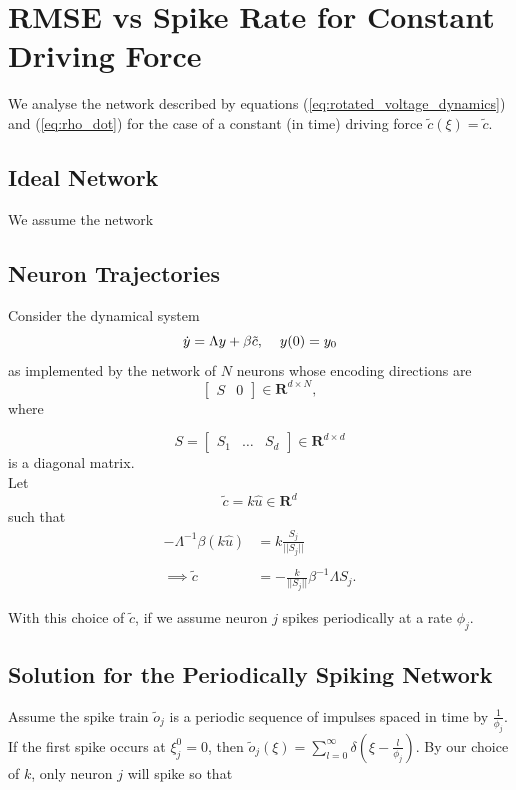 \section{RMSE vs Spike Rate for Constant Driving Force}
\label{section:analysis:sc_rmse}



We analyse the network described by equations (\ref{eq:rotated_voltage_dynamics}) and (\ref{eq:rho_dot}) for the case of a constant (in time) driving force $\tilde{c}(\xi) = \tilde{c}$. \\

\subsection{Ideal Network}
We assume the network 



\subsection{Neuron Trajectories}
Consider the dynamical system 
$$
\dot{y} = \Lambda y + \beta \tilde{c}, \hspace{4mm} y(0) = y_0
$$
as implemented by the network of $N$ neurons whose encoding directions are
$$
\begin{bmatrix}
S & 0
\end{bmatrix} \in \mathbf{R}^{d \times N},
$$
where

$$S = \begin{bmatrix}
S_1 & \hdots & S_d
\end{bmatrix} \in \mathbf{R}^{d \times d}$$
is a diagonal matrix.\\


Let $$\tilde{c} =  k \hat{u} \in \mathbf{R}^d$$ such that
\begin{align*}
-\Lambda^{-1} \beta (k \hat{u}) &= k \frac{S_j}{||S_j||}
\\
\\
\implies
\tilde{c} &= -\frac{k}{||S_j||} \beta^{-1} \Lambda S_j.
\end{align*}

With this choice of $\tilde{c}$,  if we assume neuron $j$ spikes periodically at a rate $\phi_j$. 

\subsection{Solution for the Periodically Spiking Network}

 Assume the spike train $\tilde{o}_j$ is a periodic sequence of impulses spaced in time by $\frac{1}{\phi_j}$. If the first spike occurs at $\xi_j^0 = 0$, then $\tilde{o}_j(\xi) = \sum_{l=0}^{\infty} \delta \left(\xi-\frac{l}{\phi_j}\right).$ By our choice of $k$, only neuron $j$ will spike so that 

